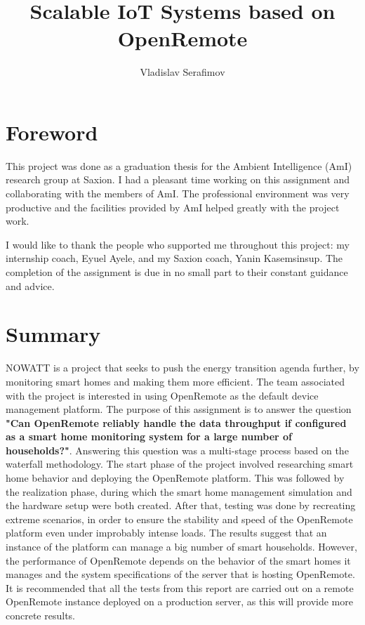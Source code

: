 \documentclass{report}
\title{Scalable IoT Systems based on OpenRemote}
\author{Vladislav Serafimov}
\begin{document}
	\maketitle
	
	
	
	\tableofcontents
	\chapter{Foreword}
	This project was done as a graduation thesis for the Ambient Intelligence (AmI) research group at Saxion. I had a pleasant time working on this assignment and collaborating with the members of AmI. The professional environment was very productive and the facilities provided by AmI helped greatly with the project work.
	
	I would like to thank the people who supported me throughout this project: my internship coach, Eyuel Ayele, and my Saxion coach, Yanin Kasemsinsup. The completion of the assignment is due in no small part to their constant guidance and advice. 
	
	\chapter{Summary}
	NOWATT is a project that seeks to push the energy transition agenda further, by monitoring smart homes and making them more efficient. The team associated with the project is interested in using OpenRemote as the default device management platform. The purpose of this assignment is to answer the question \textbf{"Can OpenRemote reliably handle the data throughput if configured as a smart home monitoring system for a large number of households?"}. Answering this question was a multi-stage process based on the waterfall methodology. The start phase of the project involved researching smart home behavior and deploying the OpenRemote platform. This was followed by the realization phase, during which the smart home management simulation and the hardware setup were both created. After that, testing was done by recreating extreme scenarios, in order to ensure the stability and speed of the OpenRemote platform even under improbably intense loads. The results suggest that an instance of the platform can manage a big number of smart households. However, the performance of OpenRemote depends on the behavior of the smart homes it manages and the system specifications of the server that is hosting OpenRemote. It is recommended that all the tests from this report are carried out on a remote OpenRemote instance deployed on a production server, as this will provide more concrete results. 
	
\end{document}
